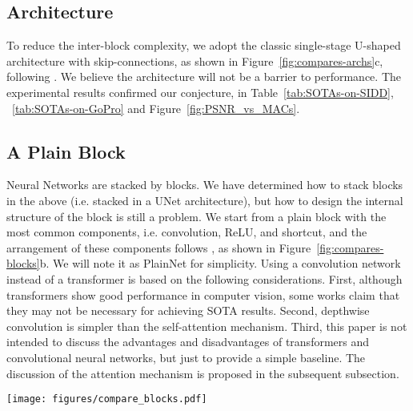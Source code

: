 \documentclass[runningheads]{llncs}
\begin{document}
\subsection {Architecture}
To reduce the inter-block complexity, we adopt the classic single-stage U-shaped architecture with skip-connections, as shown in Figure~\ref{fig:compares-archs}c, following \cite{zamir2021restormer,wang2021uformer}. We believe the architecture will not be a barrier to performance. The experimental results confirmed our conjecture, in Table~\ref{tab:SOTAs-on-SIDD}, ~\ref{tab:SOTAs-on-GoPro} and Figure~\ref{fig:PSNR_vs_MACs}. 



\subsection{A Plain Block}
Neural Networks are stacked by blocks. We have determined how to stack blocks in the above (i.e. stacked in a UNet architecture), but how to design the internal structure of the block is still a problem. We start from a plain block with the most common components, i.e. convolution, ReLU, and shortcut\cite{he2016deep}, and the arrangement of these components follows \cite{han2021demystifying,liu2021swin}, as shown in Figure~\ref{fig:compares-blocks}b. We will note it as PlainNet for simplicity. Using a convolution network instead of a transformer is based on the following considerations. First, although transformers show good performance in computer vision, some works\cite{han2021demystifying,liu2022convnet} claim that they may not be necessary for achieving SOTA results. Second, depthwise convolution is simpler than the self-attention\cite{vaswani2017attention} mechanism. Third, this paper is not intended to discuss the advantages and disadvantages of transformers and convolutional neural networks, but just to provide a simple baseline. The discussion of the attention mechanism is proposed in the subsequent subsection. 

\begin{figure*}[!t]
\texttt{[image: figures/compare\_blocks.pdf]}
\caption{Intra-block structure comparison. :matrix multiplication, /:element-wise multiplication/addition. dconv: Depthwise convolution. Nonlinear activation functions are represented by yellow boxes. (a) Restormer's block\cite{zamir2021restormer}, some details are omitted for simplicity, e.g. reshaping the feature maps. (b) PlainNet's block, which contains the most common components. (c) Our proposed baseline. Compares to (b), Channel Attention (CA) and LayerNorm are adopted. Besides, ReLU is replaced by GELU. (d) Our proposed Nonlinear Activation Free Network's block. It replaces CA/GELU with Simplified Channel Attention(SCA) and SimpleGate respectively. The details of these components are shown in Fig~\ref{fig:OurModules}}
\label{fig:compares-blocks}
\end{figure*}
\end{document}
